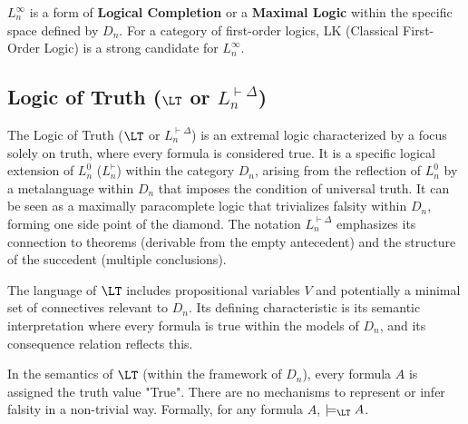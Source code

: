 																																					\begin{analogy}[Physics Analogy for $L^\infty_n$]
																																						$L^\infty_n$ is a form of \textbf{Logical Completion} or a \textbf{Maximal Logic} within the specific space defined by $D_n$. For a category of first-order logics, LK (Classical First-Order Logic) is a strong candidate for $L^\infty_n$.
																																						\end{analogy}
																																							
																																							\subsection{Logic of Truth ($\LT$ or $L^{\vdash\Delta}_n$)}
																																							
																																							The Logic of Truth ($\LT$ or $L^{\vdash\Delta}_n$) is an extremal logic characterized by a focus solely on truth, where every formula is considered true. It is a specific logical extension of $L^0_n$ ($L^{\vdash}_n$) within the category $D_n$, arising from the reflection of $L^0_n$ by a metalanguage within $D_n$ that imposes the condition of universal truth. It can be seen as a maximally paracomplete logic that trivializes falsity within $D_n$, forming one side point of the diamond. The notation $L^{\vdash\Delta}_n$ emphasizes its connection to theorems (derivable from the empty antecedent) and the structure of the succedent (multiple conclusions).
																																							
																																							\begin{definition}[Language of $\LT$]
																																								The language of $\LT$ includes propositional variables $V$ and potentially a minimal set of connectives relevant to $D_n$. Its defining characteristic is its semantic interpretation where every formula is true within the models of $D_n$, and its consequence relation reflects this.
																																								\end{definition}
																																									
																																									\begin{definition}[Semantics of $\LT$]
																																										In the semantics of $\LT$ (within the framework of $D_n$), every formula $A$ is assigned the truth value "True". There are no mechanisms to represent or infer falsity in a non-trivial way. Formally, for any formula $A$, $\models_{\LT} A$.
																																										\end{definition}
																																											
